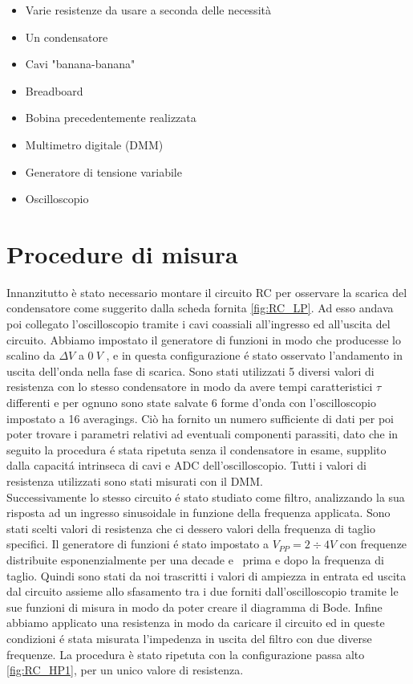 \documentclass{article}
\begin{document}
\begin{itemize}
  \item Varie resistenze da usare a seconda delle necessità
  \item Un condensatore
  \item Cavi "banana-banana"
  \item Breadboard
  \item Bobina precedentemente realizzata
  \item Multimetro digitale (DMM)
  \item Generatore di tensione variabile
  \item Oscilloscopio
\end{itemize}

\newpage

\section{Procedure di misura}

Innanzitutto è stato necessario montare il circuito RC per osservare la scarica del condensatore come suggerito dalla scheda fornita \ref{fig:RC_LP}. Ad esso andava poi collegato l'oscilloscopio tramite i cavi coassiali all'ingresso ed all'uscita del circuito. Abbiamo impostato il generatore di funzioni in modo che  producesse lo scalino da $\Delta V$ a $0\ V$ , e in questa configurazione \'e stato osservato l'andamento in uscita dell'onda nella fase di scarica. Sono stati utilizzati 5 diversi valori di resistenza con lo stesso condensatore in modo da avere tempi caratteristici $\tau$ differenti e per ognuno sono state salvate 6 forme d'onda con l'oscilloscopio impostato a 16 averagings. Ciò ha fornito un numero sufficiente di dati per poi poter trovare i parametri relativi ad eventuali componenti parassiti, dato che in seguito la procedura \'e stata ripetuta senza il condensatore in esame, supplito dalla capacit\'a intrinseca di cavi e ADC dell'oscilloscopio. Tutti i valori di resistenza utilizzati sono stati misurati con il DMM. \\

Successivamente lo stesso circuito \'e stato studiato come filtro, analizzando la sua risposta ad un ingresso sinusoidale in funzione della frequenza applicata. Sono stati scelti valori di resistenza che ci dessero valori della frequenza di taglio specifici. Il generatore di funzioni \'e stato impostato a $V_{PP} = 2\div 4 V$ con frequenze distribuite esponenzialmente per una decade e \textonehalf \ prima e dopo la frequenza di taglio. Quindi sono stati da noi trascritti i valori di ampiezza in entrata ed uscita dal circuito assieme allo sfasamento tra i due forniti dall'oscilloscopio tramite le sue funzioni di misura in modo da poter creare il diagramma di Bode. Infine abbiamo applicato una resistenza in modo da caricare il circuito ed in queste condizioni \'e stata misurata l'impedenza in uscita del filtro con due diverse frequenze. La procedura è stato ripetuta con la configurazione passa alto \ref{fig:RC_HP1}, per un unico valore di resistenza. \\
\end{document}
